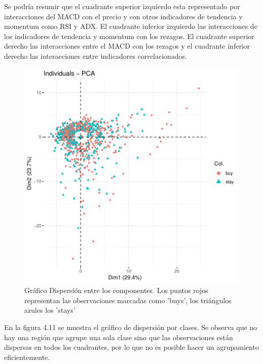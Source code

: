 \documentclass[a4paper,12pt]{Latex/Classes/PhDthesisPSnPDF}
\begin{document}
Se podría resumir que el cuadrante superior izquierdo esta representado por interacciones del MACD con el precio y con otros indicadores de tendencia y momentum como RSI y ADX. El cuadrante inferior izquierdo las interacciones de los indicadores de tendencia y momentum con los rezagos. El cuadrante superior derecho las interacciones entre el MACD con los rezagos y el cuadrante inferior derecho las interacciones entre indicadores correlacionados.


\begin{figure}[H]
\centering
\includegraphics{main-018}
\caption{Gráfico Dispersión entre los componentes. Los puntos rojos representan las observaciones marcadas como 'buys', los triángulos azules los 'stays'}
\end{figure}

En la figura 4.11 se muestra el gráfico de dispersión por clases. Se observa que no hay una región que agrupe una sola clase sino que las observaciones están dispersas en todos los cuadrantes, por lo que no es posible hacer un agrupamiento eficientemente.

\end{document}
